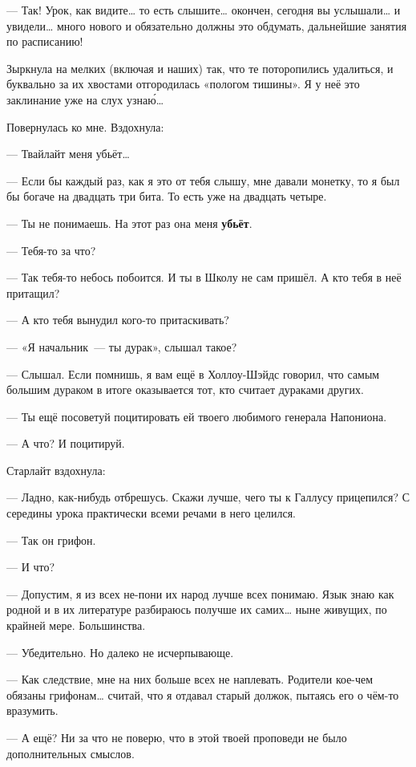 \documentclass[fontsize=11pt,a5paper,titlepage=firstcover]{scrbook}
\begin{document}
--- Так! Урок, как видите{\ldots} то есть слышите{\ldots} окончен, сегодня вы услышали{\ldots} и увидели{\ldots} много нового и обязательно должны это обдумать, дальнейшие занятия по расписанию!

Зыркнула на мелких (включая и наших) так, что те поторопились удалиться, и буквально за их хвостами отгородилась «пологом тишины». Я у неё это заклинание уже на слух узнаю́{\ldots}

Повернулась ко мне. Вздохнула:

--- Твайлайт меня убьёт{\ldots}

--- Если бы каждый раз, как я это от тебя слышу, мне давали монетку, то я был бы богаче на двадцать три бита. То есть уже на двадцать четыре.

--- Ты не понимаешь. На этот раз она меня \textbf{убьёт}.

--- Тебя-то за что?

--- Так тебя-то небось побоится. И ты в Школу не сам пришёл. А кто тебя в неё притащил?

--- А кто тебя вынудил кого-то притаскивать?

--- «Я начальник~--- ты дурак», слышал такое?

--- Слышал. Если помнишь, я вам ещё в Холлоу-Шэйдс говорил, что самым большим дураком в итоге оказывается тот, кто считает дураками других.

--- Ты ещё посоветуй поцитировать ей твоего любимого генерала Напониона.

--- А что? И поцитируй.

Старлайт вздохнула:

--- Ладно, как-нибудь отбрешусь. Скажи лучше, чего ты к Галлусу прицепился? С середины урока практически всеми речами в него целился.

--- Так он грифон.

--- И что?

--- Допустим, я из всех не-пони их народ лучше всех понимаю. Язык знаю как родной и в их литературе разбираюсь получше их самих{\ldots} ныне живущих, по крайней мере. Большинства.

--- Убедительно. Но далеко не исчерпывающе.

--- Как следствие, мне на них больше всех не наплевать. Родители кое-чем обязаны грифонам{\ldots} считай, что я отдавал старый должок, пытаясь его о чём-то вразумить.

--- А ещё? Ни за что не поверю, что в этой твоей проповеди не было дополнительных смыслов.
\end{document}
